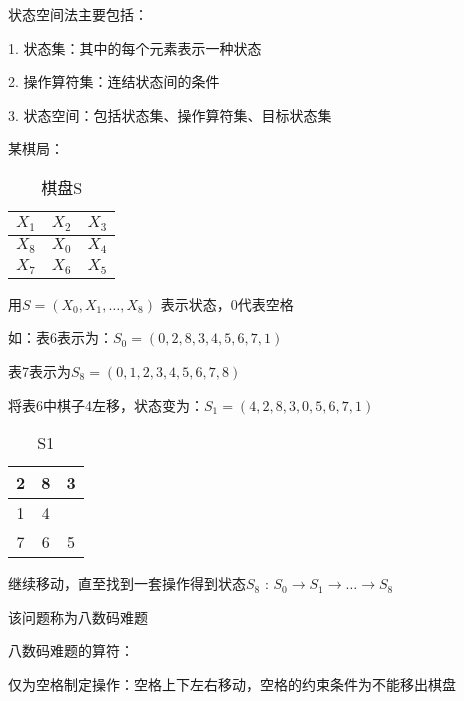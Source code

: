 \begin{notation}
    状态空间法主要包括：

    1. 状态集：其中的每个元素表示一种状态

    2. 操作算符集：连结状态间的条件

    3. 状态空间：包括状态集、操作算符集、目标状态集
\end{notation}
\begin{eg}
    某棋局：
    \begin{table}[htpb]
        \centering
        \caption{棋盘S}
        \label{tab:棋盘S}
        \begin{tabular}{|c|c|c|}
        \hline
        $X_1$ & $X_2$ & $X_3$ \\
        \hline
        $X_8$ & $X_0$ & $X_4$ \\
        \hline
        $X_7$ & $X_6$ & $X_5$ \\
        \hline
        \end{tabular}
    \end{table}

    用$S=\left( X_0,X_1,\ldots,X_8 \right) $ 表示状态，0代表空格

    如：表6表示为：$S_0=\left( 0,2,8,3,4,5,6,7,1 \right) $

    表7表示为$S_8=\left( 0,1,2,3,4,5,6,7,8 \right) $

    将表6中棋子4左移，状态变为：$S_1=\left( 4,2,8,3,0,5,6,7,1 \right) $
    \begin{table}[htpb]
        \centering
        \caption{S1}
        \label{tab:S1}
        \begin{tabular}{|c|c|c|}
        \hline
        2 & 8 & 3 \\
        \hline
        1 & 4 &   \\
        \hline
        7 & 6 & 5 \\
        \hline
        \end{tabular}
    \end{table}

    继续移动，直至找到一套操作得到状态$S_8$ : $S_0\to S_1\to \ldots\to S_8$

    该问题称为八数码难题
\end{eg}
\begin{notation}
    八数码难题的算符：

    仅为空格制定操作：空格上下左右移动，空格的约束条件为不能移出棋盘
\end{notation}
